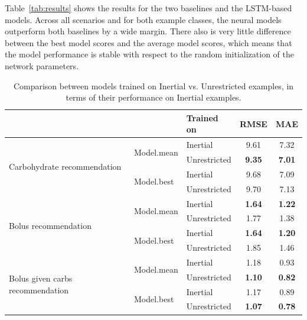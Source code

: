 \documentclass[graybox]{svmult}
\begin{document}
Table~\ref{tab:results} shows the results for the two baselines and the LSTM-based models. Across all scenarios and for both example classes, the neural models outperform both baselines by a wide margin.  There also is very little difference between the best model scores and the average model scores, which means that the model performance is stable with respect to the random initialization of the network parameters.

\begin{table}\setlength{\tabcolsep}{4pt}
\caption{Comparison between models trained on Inertial vs. Unrestricted examples, in terms of their performance on Inertial examples.}
\begin{center}
\label{tab:transfer}
\begin{tabular}{|l|l|l|c|c|}
	
    \cline{3-5}
    \multicolumn{2}{c|}{} & Trained on & RMSE & MAE\\
    \hline
    \multirow{4}{*}{Carbohydrate recommendation} & \multirow{2}{*}{Model.mean} & Inertial & 9.61 & 7.32\\
    & & Unrestricted & \textbf{9.35} & \textbf{7.01}\\
    \cline{2-5}
    & \multirow{2}{*}{Model.best} & Inertial & 9.68 & 7.09\\
    & & Unrestricted & 9.70 & 7.13\\
    \hline
    
    \multirow{4}{*}{Bolus recommendation} & \multirow{2}{*}{Model.mean} & Inertial & \textbf{1.64} & \textbf{1.22}\\
	& & Unrestricted & 1.77 & 1.38\\
   \cline{2-5}
    & \multirow{2}{*}{Model.best} & Inertial & \textbf{1.64} & \textbf{1.20}\\
    & & Unrestricted & 1.85 & 1.46\\
    \hline
    
    \multirow{4}{*}{Bolus given carbs recommendation} & \multirow{2}{*}{Model.mean} & Inertial & 1.18 & 0.93\\
    & & Unrestricted & \textbf{1.10} & \textbf{0.82}\\
	
   \cline{2-5}
    & \multirow{2}{*}{Model.best} & Inertial & 1.17 & 0.89\\ 
    & & Unrestricted & \textbf{1.07} & \textbf{0.78}\\
    \hline

\end{tabular}
\end{center}
\end{table}
\end{document}
